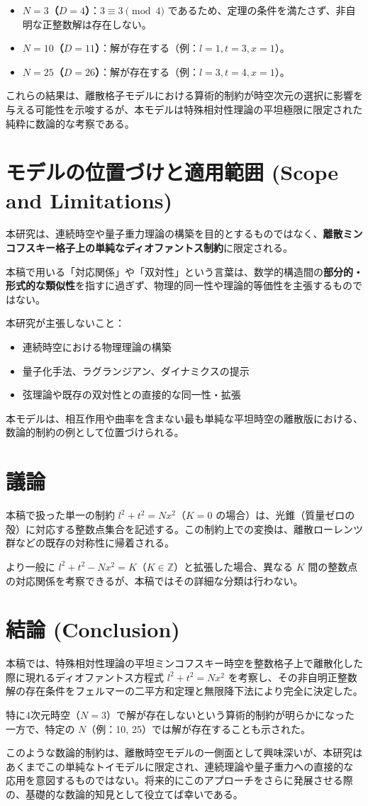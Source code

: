 \documentclass[a4paper,11pt]{ltjsarticle}
\begin{document}
\begin{itemize}
    \item \textbf{\(N=3\)（\(D=4\)）}：\(3 \equiv 3 \pmod{4}\) であるため、定理の条件を満たさず、非自明な正整数解は存在しない。
    \item \textbf{\(N=10\)（\(D=11\)）}：解が存在する（例：\(l=1, t=3, x=1\)）。
    \item \textbf{\(N=25\)（\(D=26\)）}：解が存在する（例：\(l=3, t=4, x=1\)）。
\end{itemize}

これらの結果は、離散格子モデルにおける算術的制約が時空次元の選択に影響を与える可能性を示唆するが、本モデルは特殊相対性理論の平坦極限に限定された純粋に数論的な考察である。

\section{モデルの位置づけと適用範囲 (Scope and Limitations)}
本研究は、連続時空や量子重力理論の構築を目的とするものではなく、\textbf{離散ミンコフスキー格子上の単純なディオファントス制約}に限定される。

本稿で用いる「対応関係」や「双対性」という言葉は、数学的構造間の\textbf{部分的・形式的な類似性}を指すに過ぎず、物理的同一性や理論的等価性を主張するものではない。

本研究が主張しないこと：
\begin{itemize}
    \item 連続時空における物理理論の構築
    \item 量子化手法、ラグランジアン、ダイナミクスの提示
    \item 弦理論や既存の双対性との直接的な同一性・拡張
\end{itemize}

本モデルは、相互作用や曲率を含まない最も単純な平坦時空の離散版における、数論的制約の例として位置づけられる。

\section{議論}
本稿で扱った単一の制約 \(l^2 + t^2 = N x^2\)（\(K=0\) の場合）は、光錐（質量ゼロの殻）に対応する整数点集合を記述する。この制約上での変換は、離散ローレンツ群などの既存の対称性に帰着される。

より一般に \(l^2 + t^2 - N x^2 = K\)（\(K \in \mathbb{Z}\)）と拡張した場合、異なる \(K\) 間の整数点の対応関係を考察できるが、本稿ではその詳細な分類は行わない。

\section{結論 (Conclusion)}
本稿では、特殊相対性理論の平坦ミンコフスキー時空を整数格子上で離散化した際に現れるディオファントス方程式 \(l^2 + t^2 = N x^2\) を考察し、その非自明正整数解の存在条件をフェルマーの二平方和定理と無限降下法により完全に決定した。

特に4次元時空（\(N=3\)）で解が存在しないという算術的制約が明らかになった一方で、特定の \(N\)（例：10, 25）では解が存在することも示された。

このような数論的制約は、離散時空モデルの一側面として興味深いが、本研究はあくまでこの単純なトイモデルに限定され、連続理論や量子重力への直接的な応用を意図するものではない。将来的にこのアプローチをさらに発展させる際の、基礎的な数論的知見として役立てば幸いである。
\end{document}

